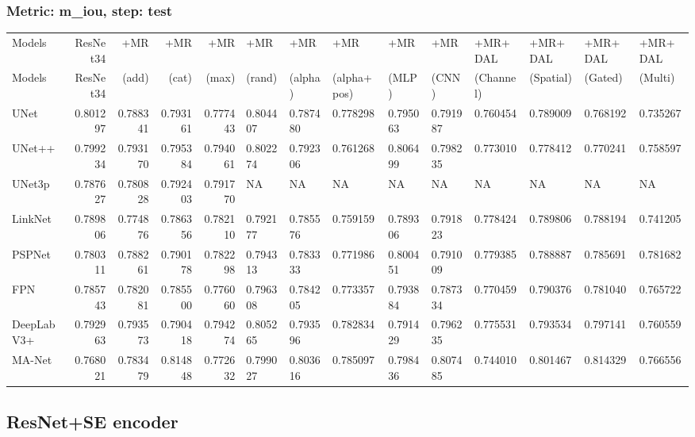 \documentclass{article}
\begin{document}
\subsubsection{Metric: m\_iou, step: test}
\begin{tabular}{lrrrrlllllllll}
\toprule
Models & ResNet34 & +MR  & +MR  & +MR  & +MR  & +MR  & +MR  & +MR  & +MR  & +MR+DAL & +MR+DAL & +MR+DAL & +MR+DAL \\
Models & ResNet34 &  (add) &  (cat) &  (max) &  (rand) &  (alpha) &  (alpha+pos) &  (MLP) &  (CNN) & (Channel) & (Spatial) & (Gated) & (Multi) \\
\midrule
UNet & 0.801297 & 0.788341 & 0.793161 & 0.777443 & 0.804407 & 0.787480 & 0.778298 & 0.795063 & 0.791987 & 0.760454 & 0.789009 & 0.768192 & 0.735267 \\
UNet++ & 0.799234 & 0.793170 & 0.795384 & 0.794061 & 0.802274 & 0.792306 & 0.761268 & 0.806499 & 0.798235 & 0.773010 & 0.778412 & 0.770241 & 0.758597 \\
UNet3p & 0.787627 & 0.780828 & 0.792403 & 0.791770 & NA & NA & NA & NA & NA & NA & NA & NA & NA \\
LinkNet & 0.789806 & 0.774876 & 0.786356 & 0.782110 & 0.792177 & 0.785576 & 0.759159 & 0.789306 & 0.791823 & 0.778424 & 0.789806 & 0.788194 & 0.741205 \\
PSPNet & 0.780311 & 0.788261 & 0.790178 & 0.782298 & 0.794313 & 0.783333 & 0.771986 & 0.800451 & 0.791009 & 0.779385 & 0.788887 & 0.785691 & 0.781682 \\
FPN & 0.785743 & 0.782081 & 0.785500 & 0.776060 & 0.796308 & 0.784205 & 0.773357 & 0.793884 & 0.787334 & 0.770459 & 0.790376 & 0.781040 & 0.765722 \\
DeepLabV3+ & 0.792963 & 0.793573 & 0.790418 & 0.794274 & 0.805265 & 0.793596 & 0.782834 & 0.791429 & 0.796235 & 0.775531 & 0.793534 & 0.797141 & 0.760559 \\
MA-Net & 0.768021 & 0.783479 & 0.814848 & 0.772632 & 0.799027 & 0.803616 & 0.785097 & 0.798436 & 0.807485 & 0.744010 & 0.801467 & 0.814329 & 0.766556 \\
\bottomrule
\end{tabular}

\subsection{ResNet+SE encoder}
\end{document}
